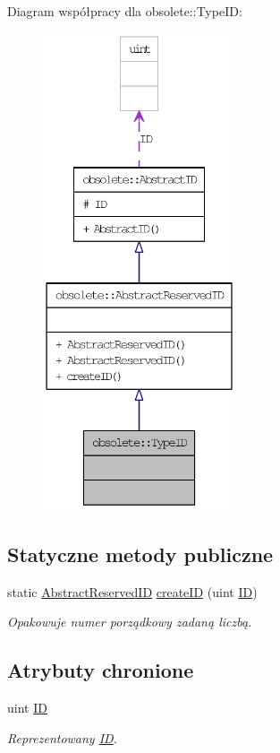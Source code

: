 Diagram współpracy dla obsolete::TypeID:\nopagebreak
\begin{figure}[H]
\begin{center}
\leavevmode
\includegraphics[height=400pt]{classobsolete_1_1TypeID__coll__graph}
\end{center}
\end{figure}
\subsection*{Statyczne metody publiczne}
\begin{DoxyCompactItemize}
\item 
static \hyperlink{classobsolete_1_1AbstractReservedID}{AbstractReservedID} \hyperlink{classobsolete_1_1AbstractReservedID_a38fa00bf6097ab9cff285c8480c8097e}{createID} (uint \hyperlink{classobsolete_1_1ID}{ID})
\begin{DoxyCompactList}\small\item\em Opakowuje numer porządkowy zadaną liczbą. \item\end{DoxyCompactList}\end{DoxyCompactItemize}
\subsection*{Atrybuty chronione}
\begin{DoxyCompactItemize}
\item 
uint \hyperlink{classobsolete_1_1AbstractID_a5f67fa1c7d96085f0ef41193b60b570c}{ID}
\begin{DoxyCompactList}\small\item\em Reprezentowany \hyperlink{classobsolete_1_1ID}{ID}. \item\end{DoxyCompactList}\end{DoxyCompactItemize}


